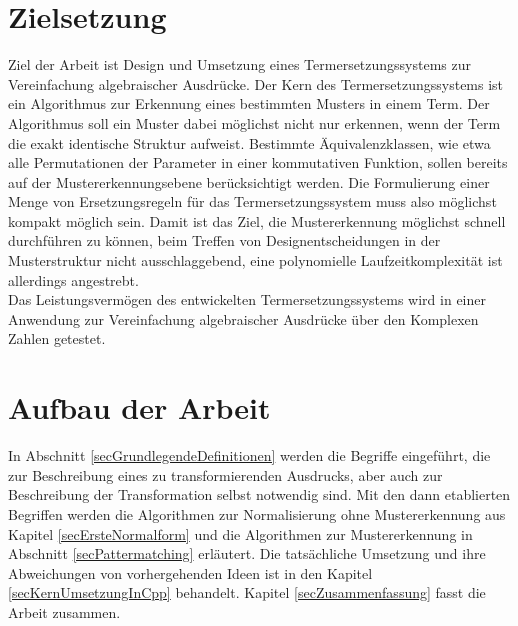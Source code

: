 \section{Zielsetzung}
Ziel der Arbeit ist Design und Umsetzung eines Termersetzungssystems zur Vereinfachung algebraischer Ausdrücke. Der Kern des Termersetzungssystems ist ein Algorithmus zur Erkennung eines bestimmten Musters in einem Term. 
Der Algorithmus soll ein Muster dabei möglichst nicht nur erkennen, wenn der Term die exakt identische Struktur aufweist. Bestimmte Äquivalenzklassen, wie etwa alle Permutationen der Parameter in einer kommutativen Funktion, sollen bereits auf der Mustererkennungsebene berücksichtigt werden. Die Formulierung einer Menge von Ersetzungsregeln für das Termersetzungssystem muss also möglichst kompakt möglich sein. 
Damit ist das Ziel, die Mustererkennung möglichst schnell durchführen zu können, beim Treffen von Designentscheidungen in der Musterstruktur nicht ausschlaggebend, eine polynomielle Laufzeitkomplexität ist allerdings angestrebt.\\
Das Leistungsvermögen des entwickelten Termersetzungssystems wird in einer Anwendung zur Vereinfachung algebraischer Ausdrücke über den Komplexen Zahlen getestet. 

\section{Aufbau der Arbeit}
In Abschnitt \ref{secGrundlegendeDefinitionen} werden die Begriffe eingeführt, die zur Beschreibung eines zu transformierenden Ausdrucks, aber auch zur Beschreibung der Transformation selbst notwendig sind. Mit den dann etablierten Begriffen werden die Algorithmen zur Normalisierung ohne Mustererkennung aus Kapitel \ref{secErsteNormalform} und die Algorithmen zur Mustererkennung in Abschnitt \ref{secPattermatching} erläutert. 
Die tatsächliche Umsetzung und ihre Abweichungen von vorhergehenden Ideen ist in den Kapitel \ref{secKernUmsetzungInCpp} behandelt. 
Kapitel \ref{secZusammenfassung} fasst die Arbeit zusammen.



